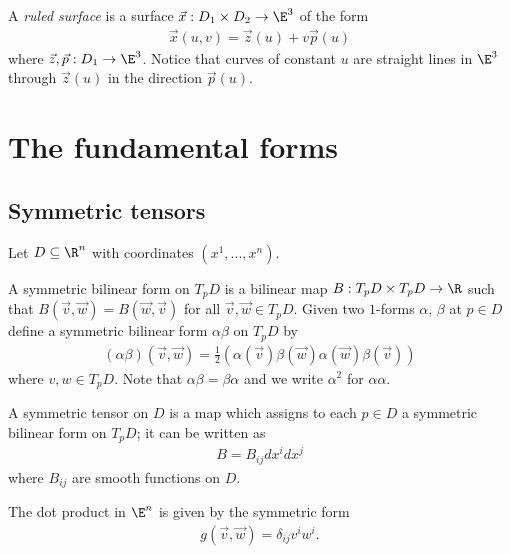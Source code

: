 \documentclass{article}
\begin{document}
\begin{definition}
    A \emph{ruled surface} is a surface $\vec x:D_1\times D_2\to\E^3$ of the form 
    \begin{align*}
        \vec x(u,v)= \vec z(u) + v\vec p(u)
    \end{align*}
    where $\vec z,\vec p:D_1\to\E^3$.
    Notice that curves of constant $u$ are straight lines in $\E^3$ through 
    $\vec z(u)$ in the direction $\vec p(u)$.
\end{definition}

\section{The fundamental forms}

\subsection{Symmetric tensors}

Let $D\subseteq\R^n$ with coordinates $(x^1,...,x^n)$.

\begin{definition}
    A symmetric bilinear form on $T_pD$ is a bilinear map $B:T_pD\times T_pD 
    \to\R$ such that $B(\vec v,\vec w)=B(\vec w,\vec v)$ for all $\vec v,\vec w\in T_pD$. Given two $1$-forms
    $\alpha$, $\beta$ at $p\in D$ define a symmetric bilinear form $\alpha\beta$
    on $T_pD$ by 
    \begin{align*}
        (\alpha\beta)(\vec v, \vec w) = \frac{1}{2}(\alpha(\vec v)\beta(\vec w) \alpha(\vec w)\beta(\vec v)) 
    \end{align*}
    where $v,w\in T_pD$. Note that $\alpha\beta=\beta\alpha$ and we write $\alpha^2$
    for $\alpha\alpha$.
\end{definition}

\begin{definition}
    A symmetric tensor on $D$ is a map which assigns to each $p\in D$ a symmetric
    bilinear form on $T_pD$; it can be written as
    \begin{align*}
        B=B_{ij}dx^idx^j
    \end{align*}
    where $B_{ij}$ are smooth functions on $D$.
\end{definition}

\begin{corollary}
    The dot product in $\E^n$ is given by the symmetric form 
    \begin{align*}
        g(\vec v, \vec w) = \delta_{ij} v^i w^i.
    \end{align*}
\end{corollary}
\end{document}
